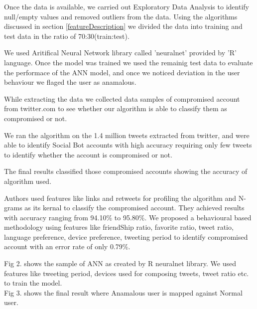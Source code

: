 \documentclass[conference]{IEEEtran}
\begin{document}
	  Once the data is available, we carried out Exploratory Data Analysis to identify null/empty values and removed outliers from the data. 
	  Using the algorithms discussed in section \ref{featureDescription} we divided the data into training and test data in the ratio of 70:30(train:test).

	  We used Aritifical Neural Network library called 'neuralnet' provided by 'R' language. 
	  Once the model was trained we used the remainig test data to evaluate the performace of the ANN model, 
	  and once we noticed deviation in the user behaviour we flaged the user as anamalous.
	
	  While extracting the data we collected data samples of compromised account from twitter.com to see 
	  whether our algorithm is able to classify them as compromised or not. 
	  
	  We ran the algorithm on the 1.4 million tweets extracted from twitter, and were able to identify Social Bot accounts 
	  with high accuracy requiring only few tweets to identify whether the account is compromised or not.
	 
	  The final results classified those compromised accounts showing the accuracy of algorithm used.
	  
	  Authors\cite{12} used features like links and retweets for profiling the algorithm and N-grams as its kernal to classify the compromised account. They 
	  achieved results with accuracy ranging from 94.10\% to 95.80\%. We proposed a behavioural based methodology using features like friendShip ratio, favorite
	  ratio, tweet ratio, language preference, device preference, tweeting period to identify compromised account with an error rate of only 0.79\%.
 
 Fig 2. shows the sample of ANN as created by R neuralnet library. We used features like tweeting period, devices used for composing tweets, 
 tweet ratio etc. to train the model.\\
 Fig 3. shows the final result where Anamalous user is mapped against Normal user.\\\\\\\\\\\\\\\\\\\\\\\\\\\\\\\\\\\\\\\\\\\\\\\\
\end{document}
